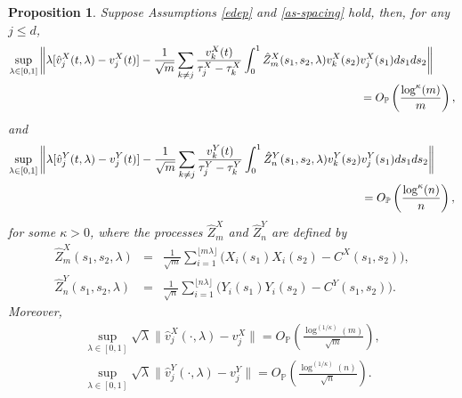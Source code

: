 \documentclass[11pt]{article}
\newtheorem{proposition}{Proposition}[section]
\numberwithin{equation}{section}
\numberwithin{theorem}{section}
\numberwithin{lemma}{section}
\numberwithin{proposition}{section}
\numberwithin{cor}{section}
\numberwithin{definition}{section}
\numberwithin{cons}{section}
\numberwithin{rem}{section}
\numberwithin{exa}{section}
\numberwithin{table}{section}
\numberwithin{figure}{section}
\numberwithin{algo}{section}
\begin{document}
{{\begin{proposition}\label{z-approx} Suppose Assumptions \ref{edep} and \ref{as-spacing} hold, then,  for any   $j\le d$,
\begin{align} \label{2.1}
\sup_{\lambda \in [0,1]} \bigg\| \lambda [\hat v^X_j(t,\lambda) - v^X_j(t)] - \frac {1}{\sqrt{m}} \sum_{k \neq j}  \frac {v^X_k(t)}{\tau^X_j - \tau^X_k} \int^1_0 \hat Z^X_m (s_1, s_2, \lambda) v^X_k (s_2) & v^X_j(s_1) ds_1  ds_2 \bigg\| \\&=O_\mathbb{P}\left( \frac{\log^\kappa(m)}{m}\right), \notag
\end{align}
and
\begin{align} \label{2.1}
\sup_{\lambda \in [0,1]} \bigg\| \lambda [\hat v^Y_j(t,\lambda) - v^Y_j(t)] - \frac {1}{\sqrt{m}} \sum_{k \neq j}  \frac {v^Y_k(t)}{\tau^Y_j - \tau^Y_k} \int^1_0 \hat Z^Y_n (s_1, s_2, \lambda) v^Y_k (s_2) & v^Y_j(s_1) ds_1  ds_2 \bigg\| \\&=O_\mathbb{P}\left( \frac{\log^\kappa(n)}{n}\right), \notag
\end{align}
for some $\kappa > 0$, where  the processes
$\hat Z^X_m$ and $\hat Z^Y_n$ are defined by
\begin{eqnarray} \label{2.3}
 \hat Z^X_m (s_1, s_2, \lambda)   &=&  \frac {1}{\sqrt{m}} \sum^{\lfloor m \lambda \rfloor}_{i=1} \big (X_i(s_1) X_i(s_2) - C^X(s_1, s_2) \big ),  \\ \label{2.4}
     \hat Z^Y_n (s_1, s_2, \lambda)   &=&  \frac {1}{\sqrt{n}} \sum^{\lfloor n \lambda \rfloor}_{i=1} \big (Y_i(s_1) Y_i(s_2) - C^Y(s_1, s_2) \big ).
\end{eqnarray}
Moreover,
\begin{align}\label{v-approx-1x}
\sup_{\lambda \in [0,1]} \sqrt{\lambda} \big\| \hat{v}^X_j(\cdot,\lambda) - v^X_j\big\|
= O_\mathbb{P}\left(\frac{\log^{(1/\kappa)}(m)}{\sqrt{m}} \right), \\
\sup_{\lambda \in [0,1]} \sqrt{\lambda} \big\| \hat{v}^Y_j(\cdot,\lambda) - v^Y_j\big\| = O_\mathbb{P}\left (\frac{\log^{(1/\kappa)}(n)}{\sqrt{n}} \right).
\label{v-approx-1y}
\end{align}
\end{proposition}

\medskip

}}
\end{document}
